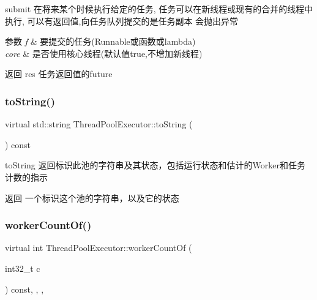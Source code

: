 submit 在将来某个时候执行给定的任务, 任务可以在新线程或现有的合并的线程中执行, 可以有返回值,向任务队列提交的是任务副本 会抛出异常 


\begin{DoxyParams}{参数}
{\em f} & 要提交的任务(Runnable或函数或lambda) \\
\hline
{\em core} & 是否使用核心线程(默认值true,不增加新线程)\\
\hline
\end{DoxyParams}
\begin{DoxyReturn}{返回}
res 任务返回值的future 
\end{DoxyReturn}
\mbox{\label{classThreadPoolExecutor_a8e340cec3bb976f7773db103d73189c2}} 
\subsubsection{\texorpdfstring{to\+String()}{toString()}}
{\footnotesize\ttfamily virtual std\+::string Thread\+Pool\+Executor\+::to\+String (\begin{DoxyParamCaption}{ }\end{DoxyParamCaption}) const\hspace{0.3cm}{\ttfamily [virtual]}}



to\+String 返回标识此池的字符串及其状态，包括运行状态和估计的\+Worker和任务计数的指示 

\begin{DoxyReturn}{返回}
一个标识这个池的字符串，以及它的状态 
\end{DoxyReturn}
\mbox{\label{classThreadPoolExecutor_a4f842d070a584bbc16a693207a947aac}} 
\subsubsection{\texorpdfstring{worker\+Count\+Of()}{workerCountOf()}}
{\footnotesize\ttfamily virtual int Thread\+Pool\+Executor\+::worker\+Count\+Of (\begin{DoxyParamCaption}\item[{int32\+\_\+t}]{c }\end{DoxyParamCaption}) const\hspace{0.3cm}{\ttfamily [inline]}, {\ttfamily [final]}, {\ttfamily [protected]}, {\ttfamily [virtual]}}



